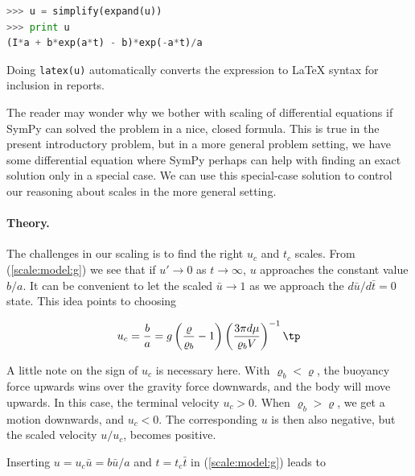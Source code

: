 \documentclass[graybox,envcountchap,sectrefs,final]{svmonodo}
\newenvironment{notice_mdfboxadmon}[1][]{
\begin{notice_mdfboxmdframed}[frametitle=#1]
}
{
\end{notice_mdfboxmdframed}
}
\begin{document}
\begin{notice_mdfboxadmon}
\begin{lstlisting}[language=Python,style=graycolor]
>>> u = simplify(expand(u))
>>> print u
(I*a + b*exp(a*t) - b)*exp(-a*t)/a
\end{lstlisting}
Doing \texttt{latex(u)} automatically converts the expression to {\LaTeX} syntax
for inclusion in reports.
\end{notice_mdfboxadmon}



The reader may wonder why we bother with scaling of differential
equations if SymPy can solved the problem in a nice, closed
formula. This is true in the present introductory problem, but in a
more general problem setting, we have some differential equation where
SymPy perhaps can help with finding an exact solution only in a
special case. We can use this special-case solution to control our
reasoning about scales in the more general setting.

\paragraph{Theory.}
The challenges in our scaling is to find the right $u_c$ and $t_c$
scales. From (\ref{scale:model:g}) we see that if $u'\rightarrow 0$
as $t\rightarrow\infty$, $u$ approaches the constant value $b/a$. It can be
convenient to let the scaled $\bar u\rightarrow 1$ as
we approach the $d\bar u/d\bar t = 0$ state. This idea points to choosing

\begin{equation}
u_c = \frac{b}{a} = g\left(\frac{\varrho}{\varrho_b} -1\right)\left(\frac{3\pi d\mu}{\varrho_b V}\right)^{-1}
\tp
\end{equation}


\begin{notice_mdfboxadmon}
A little note on the sign of $u_c$ is necessary here.
With $\varrho_b < \varrho$, the buoyancy force upwards wins over the
gravity force downwards, and the body will move upwards. In this case,
the terminal velocity $u_c > 0$. When $\varrho_b > \varrho$, we get
a motion downwards, and $u_c < 0$. The corresponding $u$ is then also
negative, but the scaled velocity $u/u_c$, becomes positive.
\end{notice_mdfboxadmon}




Inserting $u = u_c\bar u = b\bar u/a$ and $t=t_c\bar t$ in
(\ref{scale:model:g}) leads to
\end{document}
